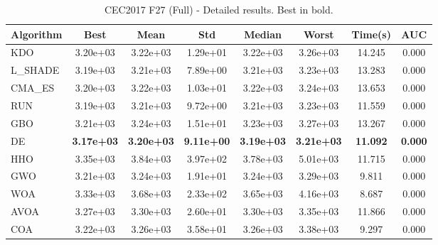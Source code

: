 \begin{table}[H]
\centering\small
\caption{CEC2017 F27 (Full) - Detailed results. Best in bold.}
\label{tab:cec2017_F27}
\begin{tabular}{lccccccc}
\toprule
\textbf{Algorithm} & \textbf{Best} & \textbf{Mean} & \textbf{Std} & \textbf{Median} & \textbf{Worst} & \textbf{Time(s)} & \textbf{AUC} \\
\midrule
KDO & 3.20e+03 & 3.22e+03 & 1.29e+01 & 3.22e+03 & 3.26e+03 & 14.245 & 0.000 \\
L_SHADE & 3.19e+03 & 3.21e+03 & 7.89e+00 & 3.21e+03 & 3.23e+03 & 13.283 & 0.000 \\
CMA_ES & 3.20e+03 & 3.22e+03 & 1.03e+01 & 3.22e+03 & 3.24e+03 & 13.653 & 0.000 \\
RUN & 3.19e+03 & 3.21e+03 & 9.72e+00 & 3.21e+03 & 3.23e+03 & 11.559 & 0.000 \\
GBO & 3.21e+03 & 3.24e+03 & 1.51e+01 & 3.23e+03 & 3.27e+03 & 13.267 & 0.000 \\
DE & \textbf{3.17e+03} & \textbf{3.20e+03} & \textbf{9.11e+00} & \textbf{3.19e+03} & \textbf{3.21e+03} & \textbf{11.092} & \textbf{0.000} \\
HHO & 3.35e+03 & 3.84e+03 & 3.97e+02 & 3.78e+03 & 5.01e+03 & 11.715 & 0.000 \\
GWO & 3.21e+03 & 3.24e+03 & 1.91e+01 & 3.24e+03 & 3.29e+03 & 9.811 & 0.000 \\
WOA & 3.33e+03 & 3.68e+03 & 2.33e+02 & 3.65e+03 & 4.16e+03 & 8.687 & 0.000 \\
AVOA & 3.27e+03 & 3.30e+03 & 2.60e+01 & 3.30e+03 & 3.35e+03 & 11.866 & 0.000 \\
COA & 3.22e+03 & 3.26e+03 & 3.58e+01 & 3.26e+03 & 3.38e+03 & 9.297 & 0.000 \\
\bottomrule
\end{tabular}
\end{table}
